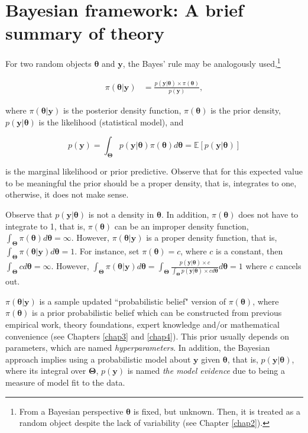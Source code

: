 \section{Bayesian framework: A brief summary of theory}\label{sec12}

For two random objects $\mathbf{\theta}$ and $\mathbf{y}$, the Bayes' rule may be analogously used,\footnote{From a Bayesian perspective $\mathbf{\theta}$ is fixed, but unknown. Then, it is treated as a random object despite the lack of variability (see Chapter \ref{chap2}).}

\begin{align}
	\pi(\mathbf{\theta}|\mathbf{y})&=\frac{p(\mathbf{y}|\mathbf{\theta}) \times \pi(\mathbf{\theta})}{p(\mathbf{y})},
	\label{eq:121}
\end{align}

where $\pi(\mathbf{\theta}|\mathbf{y})$ is the posterior density function, $\pi(\mathbf{\theta})$ is the prior density, $p(\mathbf{y}|\mathbf{\theta})$ is the likelihood (statistical model), and

\begin{equation}
	p(\mathbf{y})=\int_{\mathbf{\Theta}}p(\mathbf{y}|\mathbf{\theta})\pi(\mathbf{\theta})d\mathbf{\theta}=\mathbb{E}\left[p(\mathbf{y}|\mathbf{\theta})\right]
	\label{eq:121a}
\end{equation}

is the marginal likelihood or prior predictive. Observe that for this expected value to be meaningful the prior should be a proper density, that is, integrates to one, otherwise, it does not make sense. 

Observe that $p(\mathbf{y}|\mathbf{\theta})$ is not a density in $\mathbf{\theta}$. In addition, $\pi(\mathbf{\theta})$ does not have to integrate to 1, that is, $\pi(\mathbf{\theta})$ can be an improper density function, $\int_{\mathbf{\Theta}}\pi(\mathbf{\theta})d\mathbf{\theta}=\infty$. However, $\pi(\mathbf{\theta}|\mathbf{y})$ is a proper density function, that is, $\int_{\mathbf{\Theta}}\pi(\mathbf{\theta}|\mathbf{y})d\mathbf{\theta}=1$. For instance, set $\pi(\mathbf{\theta})=c$, where $c$ is a constant, then $\int_{\mathbf{\Theta}}cd\mathbf{\theta}=\infty$. However, $\int_{\mathbf{\Theta}}\pi(\mathbf{\theta}|\mathbf{y})d\mathbf{\theta}=\int_{\mathbf{\Theta}}\frac{p(\mathbf{y}|\mathbf{\theta})\times c}{\int_{\mathbf{\Theta}} p(\mathbf{y}|\mathbf{\theta})\times c d\mathbf{\theta}}d\mathbf{\theta}=1$ where $c$ cancels out.  

$\pi(\mathbf{\theta}|\mathbf{y})$ is a sample updated ``probabilistic belief" version of $\pi(\mathbf{\theta})$, where $\pi(\mathbf{\theta})$ is a prior probabilistic belief which can be constructed from previous empirical work, theory foundations, expert knowledge and/or mathematical convenience (see Chapters \ref{chap3} and \ref{chap4}). This prior usually depends on parameters, which are named \textit{hyperparameters}. In addition, the Bayesian approach implies using a probabilistic model about $\mathbf{y}$ given $\mathbf{\theta}$, that is, $p(\mathbf{y}|\mathbf{\theta})$, where its integral over $\mathbf{\Theta}$, $p(\mathbf{y})$ is named \textit{the model evidence} due to being a measure of model fit to the data.

